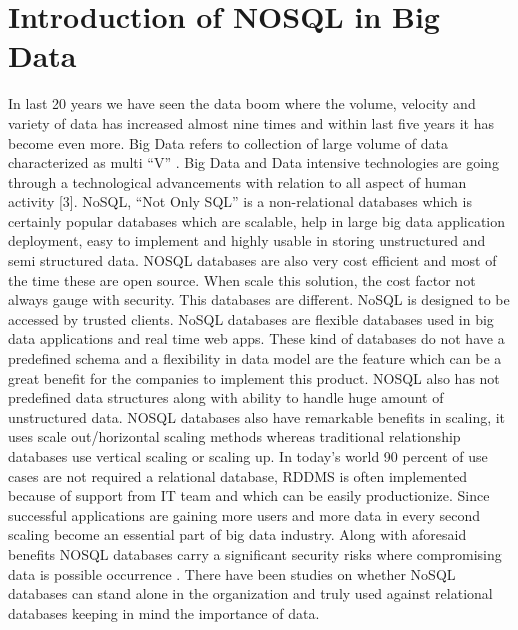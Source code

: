 \section{Introduction of NOSQL in Big Data}
In last 20 years we have seen the data boom where the volume, velocity and variety of data has increased almost nine times and within last five years it has become even more. Big Data refers to collection of large volume of data characterized as multi “V” \cite{editor01}. Big Data and Data intensive technologies are going through a technological advancements with relation to all aspect of human activity [3]. NoSQL, “Not Only SQL” is a non-relational databases which is certainly popular databases which are scalable, help in large big data application deployment, easy to implement and highly usable in storing unstructured and semi structured data. NOSQL databases are also very cost efficient and most of the time these are open source. When scale this solution, the cost factor not always gauge with security. This databases are different. NoSQL is designed to be accessed by trusted clients. NoSQL databases are flexible databases used in big data applications and real time web apps. These kind of databases do not have a predefined schema and a flexibility in data model are the feature which can be a great benefit for the companies to implement this product\cite{editor01}. NOSQL also has not predefined data structures along with ability to handle huge amount of unstructured data. NOSQL databases also have remarkable benefits in scaling, it uses scale out/horizontal scaling methods whereas traditional relationship databases use vertical scaling or scaling up. In today’s world 90 percent of use cases are not required a relational database, RDDMS is often implemented because of support from IT team and which can be easily productionize. Since successful applications are gaining more users and more data in every second scaling become an essential part of big data industry. Along with aforesaid benefits NOSQL databases carry a significant security risks where compromising data is possible occurrence \cite{editor02}. There have been studies on whether NoSQL databases can stand alone in the organization and truly used against relational databases keeping in mind the importance of data. 

